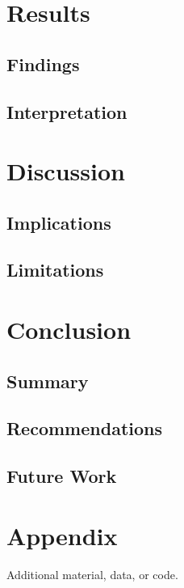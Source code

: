 \documentclass[12pt,a4paper]{report}
\begin{document}
\chapter{Results}
\section{Findings}
\section{Interpretation}

\chapter{Discussion}
\section{Implications}
\section{Limitations}

\chapter{Conclusion}
\section{Summary}
\section{Recommendations}
\section{Future Work}




\appendix
\chapter{Appendix}
Additional material, data, or code.
\end{document}
